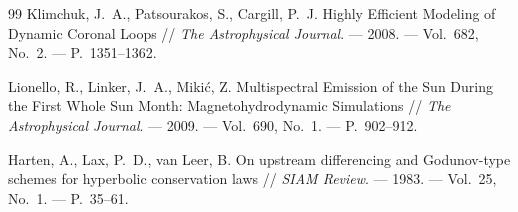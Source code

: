 \documentclass[11pt,a4paper]{article}
\begin{document}
\begin{thebibliography}{99}
Klimchuk, J.~A., Patsourakos, S., Cargill, P.~J. Highly Efficient Modeling of Dynamic Coronal Loops // \emph{The Astrophysical Journal}. --- 2008. --- Vol.~682, No.~2. --- P.~1351--1362.

Lionello, R., Linker, J.~A., Miki\'c, Z. Multispectral Emission of the Sun During the First Whole Sun Month: Magnetohydrodynamic Simulations // \emph{The Astrophysical Journal}. --- 2009. --- Vol.~690, No.~1. --- P.~902--912.

Harten, A., Lax, P.~D., van Leer, B. On upstream differencing and Godunov-type schemes for hyperbolic conservation laws // \emph{SIAM Review}. --- 1983. --- Vol.~25, No.~1. --- P.~35--61.

\end{thebibliography}
\end{document}
